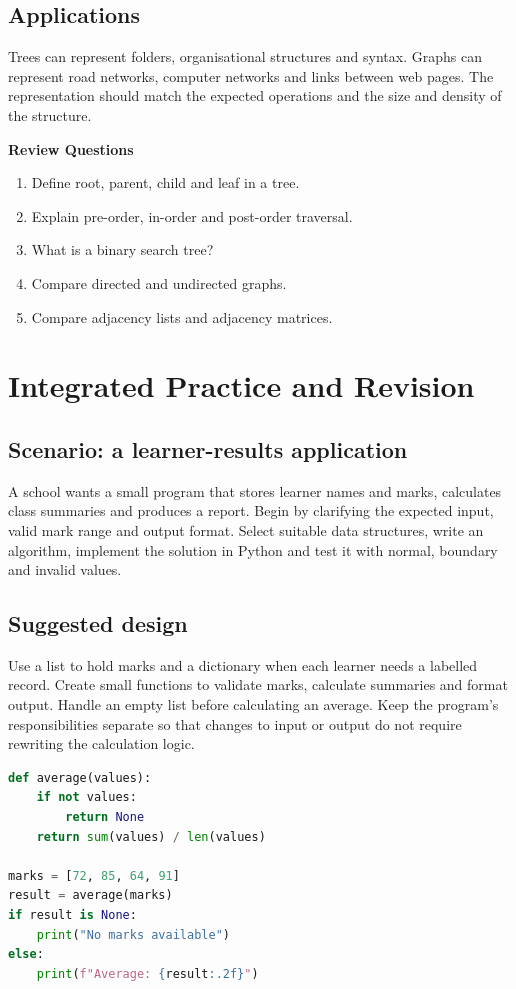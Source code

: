 \documentclass[11pt,openany,oneside]{book}
\newcommand{\reviewtitle}{\par\noindent\textbf{\color{Navy}Review Questions}\par}
\begin{document}
\section{Applications}
Trees can represent folders, organisational structures and syntax. Graphs can represent road networks, computer networks and links between web pages. The representation should match the expected operations and the size and density of the structure.

\reviewtitle
\begin{enumerate}
\item Define root, parent, child and leaf in a tree.
\item Explain pre-order, in-order and post-order traversal.
\item What is a binary search tree?
\item Compare directed and undirected graphs.
\item Compare adjacency lists and adjacency matrices.
\end{enumerate}

\chapter{Integrated Practice and Revision}
\section{Scenario: a learner-results application}
A school wants a small program that stores learner names and marks, calculates class summaries and produces a report. Begin by clarifying the expected input, valid mark range and output format. Select suitable data structures, write an algorithm, implement the solution in Python and test it with normal, boundary and invalid values.

\section{Suggested design}
Use a list to hold marks and a dictionary when each learner needs a labelled record. Create small functions to validate marks, calculate summaries and format output. Handle an empty list before calculating an average. Keep the program's responsibilities separate so that changes to input or output do not require rewriting the calculation logic.

\begin{lstlisting}[style=webcode,language=Python]
def average(values):
    if not values:
        return None
    return sum(values) / len(values)

marks = [72, 85, 64, 91]
result = average(marks)
if result is None:
    print("No marks available")
else:
    print(f"Average: {result:.2f}")
\end{lstlisting}
\end{document}
